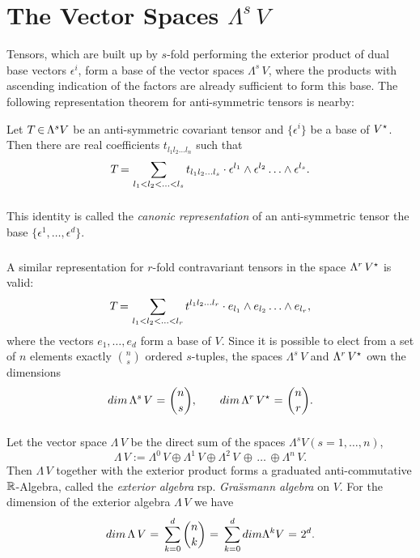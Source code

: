 \documentclass[11pt,twoside]{article}
\begin{document}
\section{The Vector Spaces $\Lambda^s \, V$}
Tensors,
which are built up by $s$-fold performing the exterior product
of dual base vectors $\epsilon^i$,
form a base of the vector spaces $\Lambda^s \, V$, 
where the products with ascending indication of the factors
are already sufficient to form this base. 
The following representation theorem for anti-symmetric tensors is nearby: 

\begin{theorem}
Let $T {\,\in\,} \Lambda^s V$ be an anti-symmetric covariant tensor and
$\{\epsilon^i\}$ be a base of $V^\star$.
Then there are real coefficients $t_{l_1 l_2 \ldots l_n}$
such that
\[
T {\,=\,} \sum_{l_1 < l_2 < \ldots < l_s} t_{l_1 l_2 \ldots l_s} \cdot
\epsilon^{l_1} \wedge \epsilon^{l_2} \ldots \wedge \epsilon^{l_s}.
\]
\end{theorem}

\subparagraph{}
This identity is called the \textit{canonic representation}
of an anti-symmetric tensor {\wrt} the base $\{\epsilon^1,\ldots,\epsilon^d\}$.

\subparagraph{}
A similar representation for $r$-fold contravariant tensors in the space
$\Lambda^r \, V^\star$ is valid:
\[
T {\,=\,} \sum_{l_1 < l_2 < \ldots < l_r} t^{l_1 l_2 \ldots l_r} \cdot
e_{l_1} \wedge e_{l_2} \ldots \wedge e_{l_r},
\]
where the vectors $e_1,\ldots,e_d$ form a base of $V$.
Since it is possible to elect from a set of $n$ elements exactly $\binom{n}{s}$ 
ordered $s$-tuples,
the spaces $\Lambda^s\,V$ and $\Lambda^r\,V^\star$ own the dimensions
\[
dim \, \Lambda^s\,V    \, {\,=\,} \, \binom{n}{s}, \qquad
dim \, \Lambda^r\,V^\star \, {\,=\,} \, \binom{n}{r}.
\]

\subparagraph{}
Let the vector space $\Lambda \, V$
be the direct sum of the spaces $\Lambda^sV (s=1,\ldots,n)$,
\[
\Lambda \, V := 
\Lambda^0 \, V \oplus \Lambda^1 \, 
             V \oplus \Lambda^2 \, 
             V \, \oplus \, \ldots \, \oplus \Lambda^n \, V.
\]
Then $\Lambda\,V$ together with the exterior product forms
a graduated anti-commutative ${\mathbb{R}}$-Algebra,
called the \textit{exterior algebra} rsp. \textit{Gra\"ssmann algebra} on $V$.
For the dimension of the exterior algebra $\Lambda \, V$ we have
\[
dim \, \Lambda\,V \, {\,=\,} \, \sum_{k=0}^d \binom{n}{k} \, {\,=\,} \,
\sum_{k=0}^d dim \Lambda^k V \, {\,=\,} \, 2^d.
\]
\end{document}
